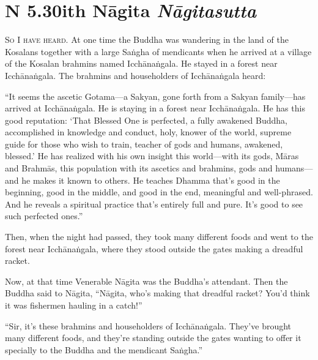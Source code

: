 \documentclass[12pt,openany]{book}%
\newcommand*{\suttatitleacronym}[1]{\smaller[2]{#1}\vspace*{.3em}}
\newcommand*{\suttatitletranslation}[1]{\linebreak{#1}}
\newcommand*{\suttatitleroot}[1]{\linebreak\smaller[2]\itshape{#1}}
\newcommand*{\tocacronym}[1]{\hspace*{-3.3em}{#1}\quad}
\newcommand*{\toctranslation}[1]{#1}
\newcommand*{\tocroot}[1]{(\textit{#1})}
\newcommand*{\scevam}[1]{\textsc{#1}}
\begin{document}
%
\section*{{\suttatitleacronym AN 5.30}{\suttatitletranslation With Nāgita }{\suttatitleroot Nāgitasutta}}
\addcontentsline{toc}{section}{\tocacronym{AN 5.30} \toctranslation{With Nāgita } \tocroot{Nāgitasutta}}

\scevam{So I have heard. }At one time the Buddha was wandering in the land of the Kosalans together with a large \textsanskrit{Saṅgha} of mendicants when he arrived at a village of the Kosalan brahmins named \textsanskrit{Icchānaṅgala}. He stayed in a forest near \textsanskrit{Icchānaṅgala}. The brahmins and householders of \textsanskrit{Icchānaṅgala} heard: 

“It seems the ascetic Gotama—a Sakyan, gone forth from a Sakyan family—has arrived at \textsanskrit{Icchānaṅgala}. He is staying in a forest near \textsanskrit{Icchānaṅgala}. He has this good reputation: ‘That Blessed One is perfected, a fully awakened Buddha, accomplished in knowledge and conduct, holy, knower of the world, supreme guide for those who wish to train, teacher of gods and humans, awakened, blessed.’ He has realized with his own insight this world—with its gods, \textsanskrit{Māras} and \textsanskrit{Brahmās}, this population with its ascetics and brahmins, gods and humans—and he makes it known to others. He teaches Dhamma that’s good in the beginning, good in the middle, and good in the end, meaningful and well-phrased. And he reveals a spiritual practice that’s entirely full and pure. It’s good to see such perfected ones.” 

Then, when the night had passed, they took many different foods and went to the forest near \textsanskrit{Icchānaṅgala}, where they stood outside the gates making a dreadful racket. 

Now, at that time Venerable \textsanskrit{Nāgita} was the Buddha’s attendant. Then the Buddha said to \textsanskrit{Nāgita}, “\textsanskrit{Nāgita}, who’s making that dreadful racket? You’d think it was fishermen hauling in a catch!” 

“Sir, it’s these brahmins and householders of \textsanskrit{Icchānaṅgala}. They’ve brought many different foods, and they’re standing outside the gates wanting to offer it specially to the Buddha and the mendicant \textsanskrit{Saṅgha}.” 
\end{document}
